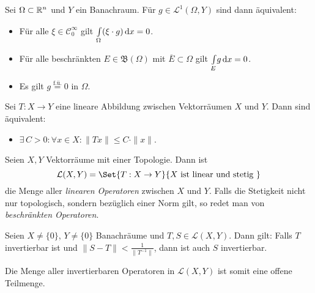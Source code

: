 \documentclass{cheat-sheet}
\newcommand{\Bor}{\mathfrak{B}} %
\newcommand{\Leb}{\mathcal{L}} %
\newcommand{\fue}{\overset{\text{f.ü.}}} %
\begin{document}
\begin{satz}
  Sei $\Omega \subset \mathbb{R}^n$ und $Y$ ein Banachraum. Für $g \in \Leb^1(\Omega, Y)$ sind dann äquivalent:
  \begin{itemize}
    \item Für alle $\xi \in \mathcal{C}_0^\infty$ gilt ${\textstyle \int\limits_{\Omega}^{}} (\xi \cdot g) \,\mathrm{d} x = 0$.
    \item Für alle beschränkten $E \in \Bor(\Omega)$ mit $\overline{E} \subset \Omega$ gilt ${\textstyle \int\limits_{E}^{}} g \,\mathrm{d} x = 0$.
    \item Es gilt $g \fue= 0$ in $\Omega$.
  \end{itemize}
\end{satz}

\begin{satz}
  Sei $T : X \to Y$ eine lineare Abbildung zwischen Vektorräumen $X$ und $Y$. Dann sind äquivalent:
  \begin{itemize}
    \item $\exists\,C > 0 : \forall x \in X : \|Tx\| \leq C \cdot \|x\|$.
  \end{itemize}
\end{satz}

\begin{defn}
  Seien $X, Y$ Vektorräume mit einer Topologie. Dann ist
  \[ \mathcal{L}(X, Y) = \Set{ T : X \to Y }{ X \text{ ist linear und stetig } } \]
  die Menge aller \emph{linearen Operatoren} zwischen $X$ und $Y$. Falls die Stetigkeit nicht nur topologisch, sondern bezüglich einer Norm gilt, so redet man von \emph{beschränkten Operatoren}.
\end{defn}

\begin{satz}
  Seien $X \not= \{0\}$, $Y \not= \{0\}$ Banachräume und $T, S \in \mathcal{L}(X, Y)$. Dann gilt: Falls $T$ invertierbar ist und $\|S-T\| < \tfrac{1}{\|T^{-1}\|}$, dann ist auch $S$ invertierbar.
\end{satz}

\begin{bem}
  Die Menge aller invertierbaren Operatoren in $\mathcal{L}(X, Y)$ ist somit eine offene Teilmenge.
\end{bem}
\end{document}
